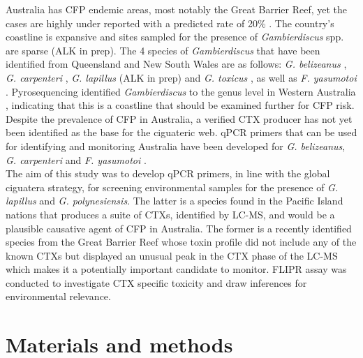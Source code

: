 \documentclass[12pt]{article}
\begin{document}
Australia has CFP endemic areas, most notably the Great Barrier Reef, yet the cases are highly under reported with a predicted rate of 20\% \citep{lewis2006ciguatera}. The country's coastline is expansive and sites sampled for the presence of \emph{Gambierdiscus} spp. are sparse (ALK in prep). The 4 species of \emph{Gambierdiscus} that have been identified from Queensland and New South Wales are as follows: \emph{G. belizeanus} \citep{murray2014molecular}, \emph{G. carpenteri} \citep{kohli2014high}, \emph{G. lapillus} (ALK in prep) and \emph{G. toxicus} \citep{hallegraeff2010algae}, as well as \emph{F. yasumotoi} \citep{murray2014molecular}. Pyrosequencing identified \emph{Gambierdiscus} to the genus level in Western Australia \citep{kohli2014cob} , indicating that this is a coastline that should be examined further for CFP risk. Despite the prevalence of CFP in Australia, a verified CTX producer has not yet been identified as the base for the ciguateric web.
qPCR primers that can be used for identifying and monitoring Australia have been developed for \emph{G. belizeanus}, \emph{G. carpenteri} and \emph{F. yasumotoi} \citep{nishimura2016quantitative,vandersea2012development}. \\ 

The aim of this study was to develop qPCR primers, in line with the global ciguatera strategy, for screening environmental samples for the presence of \emph{G. lapillus} and \emph{G. polynesiensis}. The latter is a species found in the Pacific Island nations that produces a suite of CTXs, identified by LC-MS, and would be a plausible causative agent of CFP in Australia. The former is a recently identified species from the Great Barrier Reef whose toxin profile did not include any of the known CTXs but displayed an unusual peak in the CTX phase of the LC-MS which makes it a potentially important candidate to monitor. FLIPR assay was conducted to investigate CTX specific toxicity and draw inferences for environmental relevance.
\newpage
\section{Materials and methods}
\end{document}
